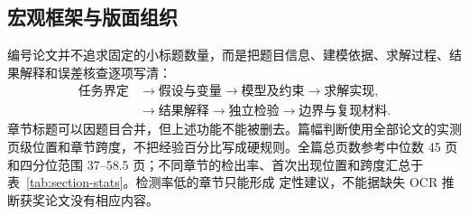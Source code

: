\documentclass[UTF8,a4paper,12pt]{ctexart}
\begin{document}
\subsection{宏观框架与版面组织}

编号论文并不追求固定的小标题数量，而是把题目信息、建模依据、求解过程、结果解释和误差核查逐项写清：
\[
\begin{aligned}
\text{任务界定}&\longrightarrow\text{假设与变量}
\longrightarrow\text{模型及约束}\longrightarrow\text{求解实现},\\
&\longrightarrow\text{结果解释}
\longrightarrow\text{独立检验}\longrightarrow\text{边界与复现材料}.
\end{aligned}
\]
章节标题可以因题目合并，但上述功能不能被删去。篇幅判断使用全部论文的实测
页级位置和章节跨度，不把经验百分比写成硬规则。全篇总页数参考中位数
45 页和四分位范围 37--58.5 页；不同章节的检出率、首次出现位置和跨度汇总于
表~\ref{tab:section-stats}。检测率低的章节只能形成
定性建议，不能据缺失 OCR 推断获奖论文没有相应内容。
\end{document}
